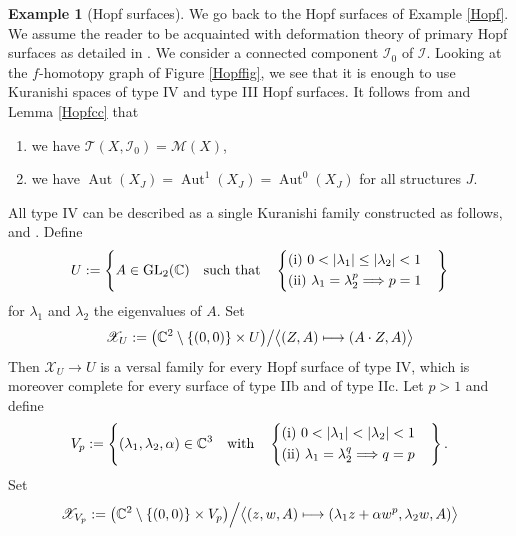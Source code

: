 \documentclass[10pt]{amsart}
\let\mathcal\mathscr
\def\mto{\mathchoice{\longmapsto}{\mapsto}{\mapsto}{\mapsto}}
\newcommand{\GL}{\mathrm{GL}}
\DeclareMathOperator{\Aut}{Aut}
\theoremstyle{plain}
\theoremstyle{definition}
\newtheorem{example}[theorem]{Example}
\theoremstyle{remark}
\numberwithin{equation}{section}
\newcommand{\CC}{{\mathbb{C}}}
\newcommand{\cI}{\mathcal{I}}
\begin{document}
\begin{example}[Hopf surfaces]
\label{Hopfbis}
We go back to the Hopf surfaces of Example \ref{Hopf}. We assume the reader to be acquainted with deformation theory of primary Hopf surfaces as detailed in \cite{We}. We consider a connected component $\cI_0$ of $\cI$. Looking at the $f$-homotopy graph of Figure \ref{Hopffig}, we see that it is enough to use Kuranishi spaces of type IV and type III Hopf surfaces. It follows from \cite{We} and Lemma \ref{Hopfcc} that
\begin{enumerate}
\item
we have $\mathcal T(X,\cI_0)=\mathcal M(X)$,
\item
we have $\Aut(X_J)=\Aut^1(X_J)=\Aut^0(X_J)$ for all structures $J$.
\end{enumerate}
All type IV can be described as a single Kuranishi family constructed as follows, \cf \cite{We} and \cite{Dabrowski}. Define\vspace*{-3pt}
\begin{equation}
\label{typeIV}
U:=\left\{
A\in \GL_2(\CC)
\quad\text{such that}\quad\left\{\begin{aligned}&\textup{(i)}\ 0<\vert\lambda_1\vert \leq \vert\lambda_2\vert<1\cr
&\textup{(ii)}\ \lambda_1 =\lambda_2^p\Longrightarrow p=1
\end{aligned}\right.
\right\}
\end{equation}
for $\lambda_1$ and $\lambda_2$ the eigenvalues of $A$.
Set
\begin{equation}
\label{typeIVfamily}
\mathcal X_U:=\big (\CC^2\setminus\{(0,0)\}\times U\big )\big /\big\langle (Z,A)\mto (A\cdot Z, A)\big\rangle
\end{equation}
Then $\mathcal X_U\to U$ is a versal family for every Hopf surface of type IV, which is moreover complete for every surface of type IIb and of type IIc. Let $p>1$ and define
\begin{equation}
\label{typeIIIp}
V_p:=\left\{
(\lambda_1,\lambda_2,\alpha)\in\CC^3
\quad\text{with}\quad\left\{\begin{aligned}&\textup{(i)}\ 0<\vert\lambda_1\vert < \vert\lambda_2\vert<1\cr
&\textup{(ii)}\ \lambda_1 =\lambda_2^q\Longrightarrow q=p
\end{aligned}\right .
\right\}.
\end{equation}
Set
\begin{equation}
\label{typeIIIpfamily}
\mathcal X_{V_p}:=\big (\CC^2\setminus\{(0,0)\}\times V_p\big )\Big /\big\langle (z,w,A)\mto (\lambda_1z+\alpha w^p,\lambda_2w, A)\big\rangle

\end{equation}
\end{example}
\end{document}
